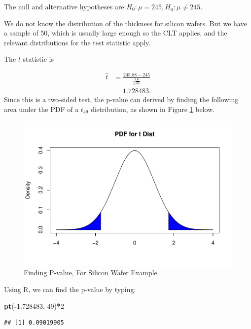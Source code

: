 \documentclass[
]{book}
\newenvironment{Shaded}{\begin{snugshade}}{\end{snugshade}}
\newcommand{\DecValTok}[1]{\textcolor[rgb]{0.00,0.00,0.81}{#1}}
\newcommand{\FloatTok}[1]{\textcolor[rgb]{0.00,0.00,0.81}{#1}}
\newcommand{\FunctionTok}[1]{\textcolor[rgb]{0.13,0.29,0.53}{\textbf{#1}}}
\newcommand{\NormalTok}[1]{#1}
\newcommand{\SpecialCharTok}[1]{\textcolor[rgb]{0.81,0.36,0.00}{\textbf{#1}}}
\begin{document}
The null and alternative hypotheses are \(H_0: \mu = 245, H_a: \mu \neq 245\).

We do not know the distribution of the thickness for silicon wafers. But we have a sample of 50, which is usually large enough so the CLT applies, and the relevant distributions for the test statistic apply.

The \(t\) statistic is

\[
\begin{split}
\hat{t} &= \frac{245.88 - 245}{\frac{3.6}{\sqrt{50}}} \\
        &= 1.728483.
\end{split}
\]
Since this is a two-sided test, the p-value can derived by finding the following area under the PDF of a \(t_{49}\) distribution, as shown in Figure \ref{fig:9-pvalworked} below.

\begin{figure}
\centering
\includegraphics{bookdown-demo_files/figure-latex/9-pvalworked-1.pdf}
\caption{\label{fig:9-pvalworked}Finding P-value, For Silicon Wafer Example}
\end{figure}

Using R, we can find the p-value by typing:

\begin{Shaded}
\begin{Highlighting}[]
\FunctionTok{pt}\NormalTok{(}\SpecialCharTok{{-}}\FloatTok{1.728483}\NormalTok{, }\DecValTok{49}\NormalTok{)}\SpecialCharTok{*}\DecValTok{2} 
\end{Highlighting}
\end{Shaded}

\begin{verbatim}
## [1] 0.09019905
\end{verbatim}
\end{document}
